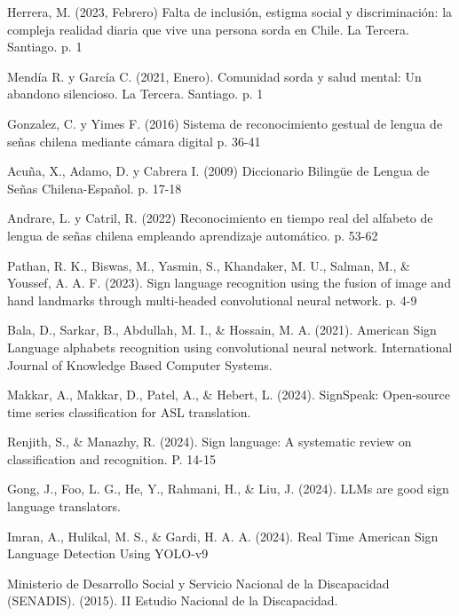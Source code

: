 \documentclass{article}
\begin{document}
\begin{thebibliography}{99}

  Herrera, M. (2023, Febrero) Falta de inclusión, estigma social y discriminación: la compleja realidad diaria que vive una persona sorda en Chile. La Tercera. Santiago. p. 1 

 Mendía R. y García C. (2021, Enero). Comunidad sorda y salud mental: Un abandono silencioso. La Tercera. Santiago. p. 1

 Gonzalez, C. y Yimes F. (2016) Sistema de reconocimiento gestual de lengua de señas chilena mediante cámara digital p. 36-41

 Acuña, X., Adamo, D. y Cabrera I. (2009) Diccionario Bilingüe de Lengua de Señas Chilena-Español. p. 17-18

 Andrare, L. y Catril, R. (2022) Reconocimiento en tiempo real del alfabeto de lengua de señas chilena empleando aprendizaje automático. p. 53-62

 Pathan, R. K., Biswas, M., Yasmin, S., Khandaker, M. U., Salman, M., \& Youssef, A. A. F. (2023). Sign language recognition using the fusion of image and hand landmarks through multi-headed convolutional neural network. p. 4-9

  Bala, D., Sarkar, B., Abdullah, M. I., \& Hossain, M. A. (2021). American Sign Language alphabets recognition using convolutional neural network. International Journal of Knowledge Based Computer Systems.

  Makkar, A., Makkar, D., Patel, A., \& Hebert, L. (2024). SignSpeak: Open-source time series classification for ASL translation.

  Renjith, S., \& Manazhy, R. (2024). Sign language: A systematic review on classification and recognition. P. 14-15

 Gong, J., Foo, L. G., He, Y., Rahmani, H., \& Liu, J. (2024). LLMs are good sign language translators. 

 Imran, A., Hulikal, M. S., \& Gardi, H. A. A. (2024). Real Time American Sign Language Detection Using YOLO-v9

 Ministerio de Desarrollo Social y Servicio Nacional de la Discapacidad (SENADIS). (2015). II Estudio Nacional de la Discapacidad.


\end{thebibliography}
\end{document}
